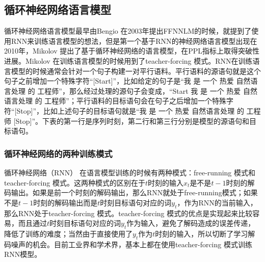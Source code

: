 \documentclass[twoside,a4paper,12pt]{book}%
\begin{document}
\subsection{循环神经网络语言模型}
循环神经网络语言模型最早由Bengio 在2003年提出FFNNLM的时候，就提到了使用\gls{RNN}来训练语言模型的想法，但是第一个基于\gls{RNN}的神经网络语言模型出现在2010年，Mikolov 提出了基于循环神经网络的语言模型，在PPL指标上取得突破性进展。Mikolov 在训练语言模型的时候用到了teacher-forcing 模式。\gls{RNN}在训练语言模型的时候通常会针对一个句子构建一对平行语料。平行语料的源语句就是这个句子之前增加一个特殊字符“[Start]”，比如给定的句子是“我 是 一个 热爱 自然语言处理 的 工程师”，那么经过处理的源句子会变成，“Start 我 是 一个 热爱 自然语言处理 的 工程师”；平行语料的目标语句会在句子之后增加一个特殊字符“[Stop]”，比如上述句子的目标语句就是“我 是 一个 热爱 自然语言处理 的 工程师 [Stop]”。下表的第一行是序列时刻，第二行和第三行分别是模型的源语句和目标语句。
\begin{table}[h]
	\caption{语言模型数据处理}  
	\label{tab:schedule}
	\centering
\end{table}
\subsubsection{循环神经网络的两种训练模式}
循环神经网络（\gls{RNN}） 在语言模型训练的时候有两种模式：free-running 模式和teacher-forcing 模式。这两种模式的区别在于$t$时刻的输入$x_t$是不是$t-1$时刻的解码输出。如果是前一个时刻的解码输出，那么\gls{RNN}就处于free-running模式；如果不是$t-1$时刻的解码输出而是$t$时刻目标语句对应的词$y_{t}$，作为\gls{RNN}的当前输入，那么\gls{RNN}处于teacher-forcing 模式。teacher-forcing 模式的优点是实现起来比较容易，而且通过$t$时刻目标语句对应的词$y_{t}$作为输入，避免了解码造成的误差传递，降低了训练的难度；当然由于直接使用了$y_{t}$作为$t$时刻的输入，所以切断了学习解码噪声的机会。目前工业界和学术界，基本上都在使用teacher-forcing 模式训练\gls{RNN}模型。
\end{document}
